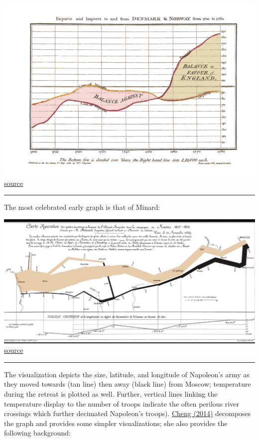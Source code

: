 \documentclass[
  openany]{book}
\begin{document}
\includegraphics{playfair1786.PNG}\href{https://robots.thoughtbot.com/analyzing-minards-visualization-of-napoleons-1812-march}{source}

\begin{center}\rule{0.5\linewidth}{\linethickness}\end{center}

The most celebrated early graph is that of Minard:

\includegraphics{minard1812.PNG}\href{https://datavizblog.com/2013/05/30/dataviz-history-charles-minards-flow-map-of-napoleons-russian-campaign-of-1812-polotsk-smolensk-and-on-to-borodino/}{source}

\begin{center}\rule{0.5\linewidth}{\linethickness}\end{center}

The visualization depicts the size, latitude, and longitude of Napoleon's army as they moved towards (tan line) then away (black line) from Moscow; temperature during the retreat is plotted as well. Further, vertical lines linking the temperature display to the number of troops indicate the often perilous river crossings which further decimated Napoleon's troops). \href{https://robots.thoughtbot.com/analyzing-minards-visualization-of-napoleons-1812-march}{Cheng (2014)} decomposes the graph and provides some simpler visualizations; she also provides the following background:
\end{document}
